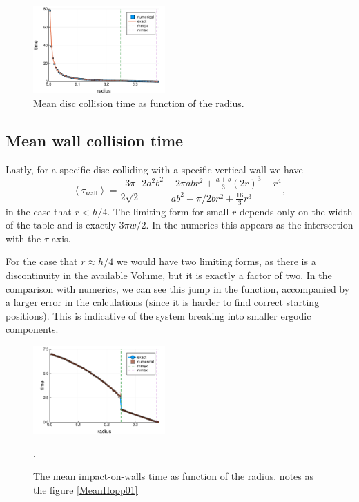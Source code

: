 \documentclass[superscriptaddress,pre,reprint,showpacs,twocolumn]{revtex4-1}
\newcommand{\mean}[1]{\left \langle #1 \right \rangle}
\begin{document}
\begin{figure}[h]
  \centering
  \includegraphics[width=0.45\textwidth]{figures/DiscCollisions01.pdf}
  \caption{Mean disc collision time as function of the radius. }\label{MeanCol01}
\end{figure}



\subsection{Mean wall collision time}

Lastly, for a specific disc colliding with a specific vertical wall we have
\begin{equation}\label{impactwall}
 \mean{\tau_\text{wall}} = 	
\frac{3 \pi}{2\sqrt{2}}
\frac { 2a^{2} b^{2}  -  2\pi a b r^{2} + \frac{a+b}{3}(2r)^3 - r^4}
{ab^2-\pi/2b r^2 + \frac{16}{3} r^3 },
\end{equation}
in the case that $r<h/4$. The limiting form for small $r$ depends
only on the width of the table and is exactly
$3\pi w/2$. In the numerics this appears as the intersection with the $\tau$
axis.

For the case that $r\approx h/4$ we would have two limiting forms,
as there is a discontinuity in the available Volume, but it is exactly
a factor of two. In the comparison with numerics, we can see
this jump in the function, accompanied by a larger error in the
calculations (since it is harder to find correct starting positions). 
This is indicative of 
the system breaking into smaller ergodic components.


\begin{figure}[h]
  \centering
  \includegraphics[width=0.45\textwidth]{./figures/HitRightWall01.pdf}
  \caption{The mean impact-on-walls time as function of the radius. 
    notes as the figure \ref{MeanHopp01}}
    \label{MeanImp01}.
\end{figure}
\end{document}
